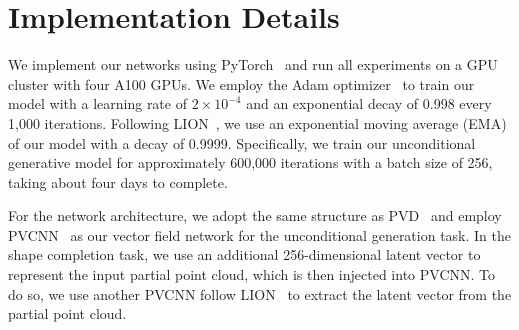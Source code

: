 
\section{Implementation Details}
\label{sec:implementation_details}

We implement our networks using PyTorch~\cite{paszke2019pytorch} and run all experiments on a GPU cluster with four A100 GPUs.
%
We employ the Adam optimizer~\cite{kingma2014adam} to train our model with a learning rate of $2 \times 10^{-4}$ and an exponential decay of 0.998 every 1,000 iterations.
%
Following LION~\cite{zeng2022lion}, we use an exponential moving average (EMA) 
of our model with a decay of 0.9999.
%
Specifically, we train our unconditional generative model for approximately 600,000 iterations with a batch size of 256, taking about four days to complete.
%

For the network architecture, we adopt the same structure as PVD~\cite{zhou2021pvd} and employ PVCNN~\cite{liu2019point} as our vector field network for the unconditional generation task.
%
In the shape completion task, we use an additional 256-dimensional latent vector to represent the input partial point cloud, which is then injected into PVCNN.
%
%
To do so, we use another PVCNN follow LION~\cite{zeng2022lion} to extract the latent vector from the partial point cloud.
%

